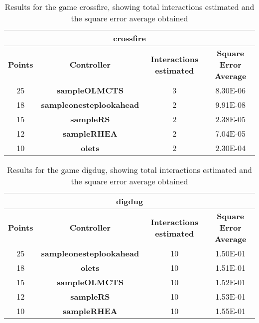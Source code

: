 \begin{table*}[!t]
\begin{center}
\begin{adjustbox}{width=1\textwidth}
\begin{tabular}{|c|c|c|c|}
\hline
\multicolumn{4}{|c|}{\textbf{crossfire}}\\
\hline
\textbf{Points} & \textbf{Controller} & \textbf{Interactions estimated} & \textbf{Square Error Average}\\
\hline
25 & \textbf{sampleOLMCTS} & 3 & 8.30E-06
 \\
\hline
18 & \textbf{sampleonesteplookahead} & 2 & 9.91E-08
 \\
\hline
15 & \textbf{sampleRS} & 2 & 2.38E-05
 \\
\hline
12 & \textbf{sampleRHEA} & 2 & 7.04E-05
 \\
\hline
10 & \textbf{olets} & 2 & 2.30E-04
 \\
\hline
\end{tabular}
\end{adjustbox}
\caption{Results for the game crossfire, showing total interactions estimated and the square error average obtained}
\label{tab:weights}
\end{center}
\end{table*}
\begin{table*}[!t]
\begin{center}
\begin{adjustbox}{width=1\textwidth}
\begin{tabular}{|c|c|c|c|}
\hline
\multicolumn{4}{|c|}{\textbf{digdug}}\\
\hline
\textbf{Points} & \textbf{Controller} & \textbf{Interactions estimated} & \textbf{Square Error Average}\\
\hline
25 & \textbf{sampleonesteplookahead} & 10 & 1.50E-01
 \\
\hline
18 & \textbf{olets} & 10 & 1.51E-01
 \\
\hline
15 & \textbf{sampleOLMCTS} & 10 & 1.52E-01
 \\
\hline
12 & \textbf{sampleRS} & 10 & 1.53E-01
 \\
\hline
10 & \textbf{sampleRHEA} & 10 & 1.55E-01
 \\
\hline
\end{tabular}
\end{adjustbox}
\caption{Results for the game digdug, showing total interactions estimated and the square error average obtained}
\label{tab:weights}
\end{center}
\end{table*}

